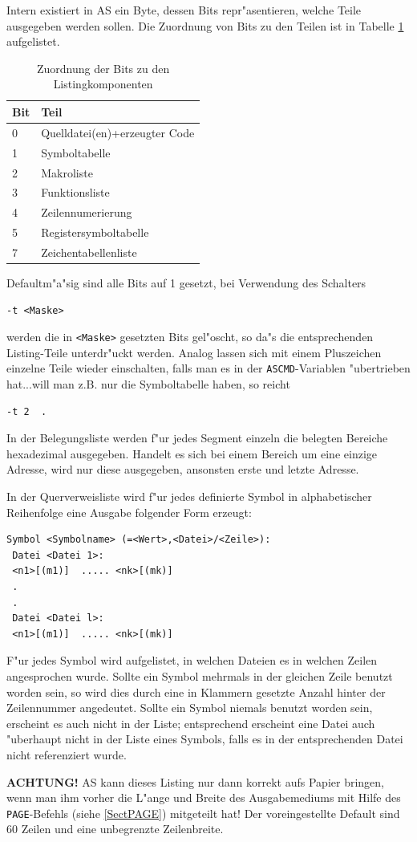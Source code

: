 \documentclass[12pt,a4paper,twoside]{report}
\newcommand{\bb}[1]{{\bf #1}}
\newcommand{\tty}[1]{{\tt #1}}
\newcommand{\asname}{AS}
\begin{document}
Intern existiert in \asname{} ein Byte, dessen Bits repr"asentieren, welche Teile
ausgegeben werden sollen.  Die Zuordnung von Bits zu den Teilen ist in
Tabelle \ref{TabTBits} aufgelistet.
\par
\begin{table}[p]
\begin{center}\begin{tabular}{|l|l|}
\hline
Bit & Teil \\
\hline
\hline
0   & Quelldatei(en)+erzeugter Code \\
1   & Symboltabelle \\
2   & Makroliste \\
3   & Funktionsliste \\
4   & Zeilennumerierung \\
5   & Registersymboltabelle \\
7   & Zeichentabellenliste \\
\hline
\end{tabular}\end{center}
\caption{Zuordnung der Bits zu den Listingkomponenten\label{TabTBits}}
\end{table}
Defaultm"a"sig sind alle Bits auf 1 gesetzt, bei Verwendung des Schalters
\begin{verbatim}
-t <Maske>
\end{verbatim}
werden die in \verb!<Maske>! gesetzten Bits gel"oscht, so da"s die entsprechenden
Listing-Teile unterdr"uckt werden.  Analog lassen sich mit einem Pluszeichen
einzelne Teile wieder einschalten, falls man es in der \tty{ASCMD}-Variablen
"ubertrieben hat...will man z.B. nur die Symboltabelle haben, so reicht
\begin{verbatim}
-t 2  .
\end{verbatim}
In der Belegungsliste werden f"ur jedes Segment einzeln die belegten Bereiche
hexadezimal ausgegeben.  Handelt es sich bei einem Bereich um eine einzige
Adresse, wird nur diese ausgegeben, ansonsten erste und letzte Adresse.
\par
In der Querverweisliste wird f"ur jedes definierte Symbol in alphabetischer
Reihenfolge eine Ausgabe folgender Form erzeugt:
\begin{verbatim}
Symbol <Symbolname> (=<Wert>,<Datei>/<Zeile>):
 Datei <Datei 1>:
 <n1>[(m1)]  ..... <nk>[(mk)]
 .
 .
 Datei <Datei l>:
 <n1>[(m1)]  ..... <nk>[(mk)]
\end{verbatim}
F"ur jedes Symbol wird aufgelistet, in welchen Dateien es in welchen Zeilen
angesprochen wurde.  Sollte ein Symbol mehrmals in der gleichen Zeile
benutzt worden sein, so wird dies durch eine in Klammern gesetzte Anzahl
hinter der Zeilennummer angedeutet.  Sollte ein Symbol niemals benutzt
worden sein, erscheint es auch nicht in der Liste; entsprechend erscheint
eine Datei auch "uberhaupt nicht in der Liste eines Symbols, falls es in
der entsprechenden Datei nicht referenziert wurde.
\par
\bb{ACHTUNG!} \asname{} kann dieses Listing nur dann korrekt aufs Papier bringen,
wenn man ihm vorher die L"ange und Breite des Ausgabemediums mit Hilfe des
\tty{PAGE}-Befehls (siehe \ref{SectPAGE}) mitgeteilt hat!  Der voreingestellte
Default sind 60 Zeilen und eine unbegrenzte Zeilenbreite.
\end{document}
